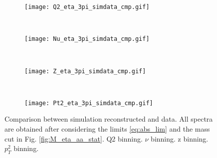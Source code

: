 \begin{figure}[!ht]
\centering
\begin{subfigure}[b]{0.45\textwidth}
\texttt{[image: Q2\_eta\_3pi\_simdata\_cmp.gif]}
\caption{}
\label{fig:Q2_3pi_simcmp}
\end{subfigure}
~
\begin{subfigure}[b]{0.45\textwidth}
\texttt{[image: Nu\_eta\_3pi\_simdata\_cmp.gif]}
\caption{}
\label{fig:Nu_3pi_simcmp}
\end{subfigure}
~
\begin{subfigure}[b]{0.45\textwidth}
\texttt{[image: Z\_eta\_3pi\_simdata\_cmp.gif]}
\caption{}
\label{fig:Z_3pi_simcmp}
\end{subfigure}
~
\begin{subfigure}[b]{0.45\textwidth}
\texttt{[image: Pt2\_eta\_3pi\_simdata\_cmp.gif]}
\caption{}
\label{fig:Pt2_3pi_simcmp}
\end{subfigure}
\caption{Comparison between simulation reconstructed and data. All spectra are obtained after considering the limits \eqref{eq:abs_lim} and the mass cut in Fig. \ref{fig:M_eta_aa_stat}. \protect{} Q2 binning. \protect{} $\nu$ binning. \protect{} z binning. \protect{} $p_T^2$ binning.}
\label{fig:3pi_simcmp}
\end{figure}
\clearpage
%

